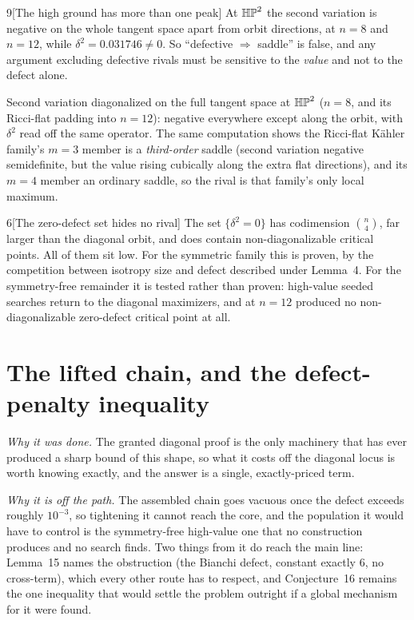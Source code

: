 \begin{Obs}{9}[The high ground has more than one peak]
At $\mathbb{HP}^2$ the second variation is negative on the whole tangent space apart from orbit directions, at $n=8$ and $n=12$, while $\delta^2=0.031746\ne0$. So ``defective $\Rightarrow$ saddle'' is false, and any argument excluding defective rivals must be sensitive to the \emph{value} and not to the defect alone.

\begin{certificate}
Second variation diagonalized on the full tangent space at $\mathbb{HP}^2$ ($n=8$, and its Ricci-flat padding into $n=12$): negative everywhere except along the orbit, with $\delta^2$ read off the same operator. The same computation shows the Ricci-flat K\"ahler family's $m=3$ member is a \emph{third-order} saddle (second variation negative semidefinite, but the value rising cubically along the extra flat directions), and its $m=4$ member an ordinary saddle, so the rival is that family's only local maximum.
\end{certificate}
\end{Obs}

\begin{Conj}{6}[The zero-defect set hides no rival]
The set $\{\delta^2=0\}$ has codimension $\binom n4$, far larger than the diagonal orbit, and does contain non-diagonalizable critical points. All of them sit low. For the symmetric family this is proven, by the competition between isotropy size and defect described under Lemma~4. For the symmetry-free remainder it is tested rather than proven: high-value seeded searches return to the diagonal maximizers, and at $n=12$ produced no non-diagonalizable zero-defect critical point at all.
\end{Conj}


\section{The lifted chain, and the defect-penalty inequality}\label{app:C}

\emph{Why it was done.} The granted diagonal proof is the only machinery that has ever produced a sharp bound of this shape, so what it costs off the diagonal locus is worth knowing exactly, and the answer is a single, exactly-priced term.

\emph{Why it is off the path.} The assembled chain goes vacuous once the defect exceeds roughly $10^{-3}$, so tightening it cannot reach the core, and the population it would have to control is the symmetry-free high-value one that no construction produces and no search finds. Two things from it do reach the main line: Lemma~15 names the obstruction (the Bianchi defect, constant exactly $6$, no cross-term), which every other route has to respect, and Conjecture~16 remains the one inequality that would settle the problem outright if a global mechanism for it were found.

